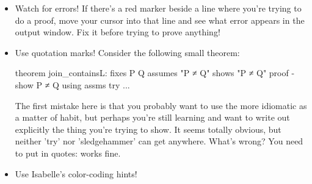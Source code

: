 \begin{itemize}
    \item Watch for errors! If there's a red marker beside a line where you're trying to do a proof, move your cursor into that line and see what error appears in the output window. Fix it before trying to prove anything!

    \item Use quotation marks! Consider the following small theorem:
\begin{IS}    
theorem join_containsL:
  fixes P Q
  assumes "P ≠ Q"
  shows "P ≠ Q"
proof -
  show P ≠ Q using assms try 
...
\end{IS}
The first mistake here is that you probably want to use the more idiomatic  as a matter of habit, but perhaps you're still learning and want to write out explicitly the thing you're trying to show. It seems totally obvious, but neither 'try' nor 'sledgehammer' can get anywhere. What's wrong? You need to put  in quotes:
 works fine. 

\item Use Isabelle's color-coding hints! 
\end{itemize}